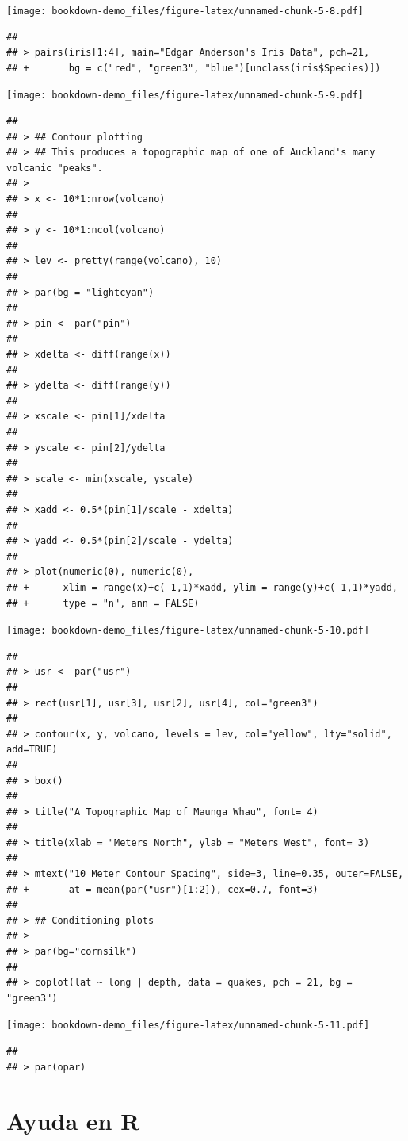 \documentclass[
]{book}
\begin{document}
\texttt{[image: bookdown-demo\_files/figure-latex/unnamed-chunk-5-8.pdf]}

\begin{verbatim}
## 
## > pairs(iris[1:4], main="Edgar Anderson's Iris Data", pch=21,
## +       bg = c("red", "green3", "blue")[unclass(iris$Species)])
\end{verbatim}

\texttt{[image: bookdown-demo\_files/figure-latex/unnamed-chunk-5-9.pdf]}

\begin{verbatim}
## 
## > ## Contour plotting
## > ## This produces a topographic map of one of Auckland's many volcanic "peaks".
## > 
## > x <- 10*1:nrow(volcano)
## 
## > y <- 10*1:ncol(volcano)
## 
## > lev <- pretty(range(volcano), 10)
## 
## > par(bg = "lightcyan")
## 
## > pin <- par("pin")
## 
## > xdelta <- diff(range(x))
## 
## > ydelta <- diff(range(y))
## 
## > xscale <- pin[1]/xdelta
## 
## > yscale <- pin[2]/ydelta
## 
## > scale <- min(xscale, yscale)
## 
## > xadd <- 0.5*(pin[1]/scale - xdelta)
## 
## > yadd <- 0.5*(pin[2]/scale - ydelta)
## 
## > plot(numeric(0), numeric(0),
## +      xlim = range(x)+c(-1,1)*xadd, ylim = range(y)+c(-1,1)*yadd,
## +      type = "n", ann = FALSE)
\end{verbatim}

\texttt{[image: bookdown-demo\_files/figure-latex/unnamed-chunk-5-10.pdf]}

\begin{verbatim}
## 
## > usr <- par("usr")
## 
## > rect(usr[1], usr[3], usr[2], usr[4], col="green3")
## 
## > contour(x, y, volcano, levels = lev, col="yellow", lty="solid", add=TRUE)
## 
## > box()
## 
## > title("A Topographic Map of Maunga Whau", font= 4)
## 
## > title(xlab = "Meters North", ylab = "Meters West", font= 3)
## 
## > mtext("10 Meter Contour Spacing", side=3, line=0.35, outer=FALSE,
## +       at = mean(par("usr")[1:2]), cex=0.7, font=3)
## 
## > ## Conditioning plots
## > 
## > par(bg="cornsilk")
## 
## > coplot(lat ~ long | depth, data = quakes, pch = 21, bg = "green3")
\end{verbatim}

\texttt{[image: bookdown-demo\_files/figure-latex/unnamed-chunk-5-11.pdf]}

\begin{verbatim}
## 
## > par(opar)
\end{verbatim}

\hypertarget{ayuda-en-r}{%
\section{Ayuda en R}\label{ayuda-en-r}}
\end{document}
